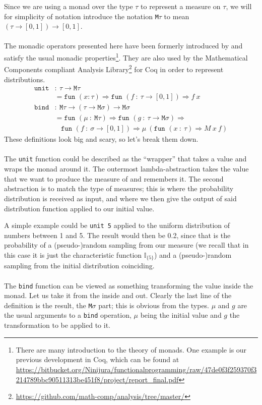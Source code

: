 \documentclass[11pt, leqno, titlepage]{article}
\theoremstyle{definition}
\begin{document}
Since we are using a monad over the type $\tau$ to represent a measure on $\tau$, we
will for simplicity of notation introduce the notation \texttt{M}$\tau$ to mean 
$(\tau\to[0,1])\to[0,1]$.\\ 
\\
The monadic operators presented here have been formerly introduced by \cite{rml-paper}
and satisfy the usual monadic properties\footnote{There are many introduction to the
theory of monads. One example is our previous development in Coq, which can be found
at
\url{https://bitbucket.org/Ninijura/functionalprogramming/raw/47de0f3f259370f3214789bbc90511313be451f8/project/report_final.pdf}}. They
are also used by the Mathematical Components compliant Analysis Library\footnote
{\url{https://github.com/math-comp/analysis/tree/master/}} for Coq in order to
represent distributions.
\begin{align*}
  \texttt{unit} & :~ \tau\to\texttt{M}\tau\\
                & = \texttt{fun }(x:\tau)\Rightarrow
                  \texttt{fun }(f~:~\tau\to[0,1])\Rightarrow f~x\\
  \texttt{bind} & :~\texttt{M}\tau\to(\tau\to\texttt{M}\sigma)\to\texttt{M}\sigma\\
                & = \texttt{fun }(\mu~:~\texttt{M}\tau)\Rightarrow \texttt{fun }
                  (g~:~\tau\to\texttt{M}\sigma) \Rightarrow\\
                & ~~~~\texttt{fun }(f~:~\sigma\to[0,1])\Rightarrow \mu~ (\texttt{fun
                  }(x~:~\tau)\Rightarrow M~x~f)
\end{align*}
These definitions look big and scary, so let's break them down.
\\ \\
The \texttt{unit} function could be described as the ``wrapper'' that takes a value
and wraps the monad around it. The outermost lambda-abstraction takes the value that
we want to produce the measure of and remembers it. The second abstraction is to
match the type of measures; this is where the probability distribution is received as
input, and where we then give the output of said distribution function applied to our
initial value.

A simple example could be \texttt{unit 5} applied to the uniform distribution of
numbers between 1 and 5. The result would then be 0.2, since that is the probability
of a (pseudo-)random sampling from our measure (we recall that in this case it is
just the characteristic function $\mathbb{I}_{\{5\}}$) and a (pseudo-)random sampling
from the initial distribution coinciding. 
\\ \\
The \texttt{bind} function can be viewed as something transforming the value inside
the monad. 
Let us take it from the inside and out. Clearly the last line of the definition is
the result, the \texttt{M}$\sigma$ part; this is obvious from the types. $\mu$ and
$g$ are the usual arguments to a \texttt{bind} operation, $\mu$ being the initial
value and $g$ the transformation to be applied to it.
\end{document}
